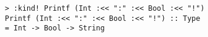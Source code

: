 \begin{repl}\begin{lstlisting}
> :kind! Printf (Int :<< ":" :<< Bool :<< "!")
Printf (Int :<< ":" :<< Bool :<< "!") :: Type
= Int -> Bool -> String\end{lstlisting}\end{repl}
